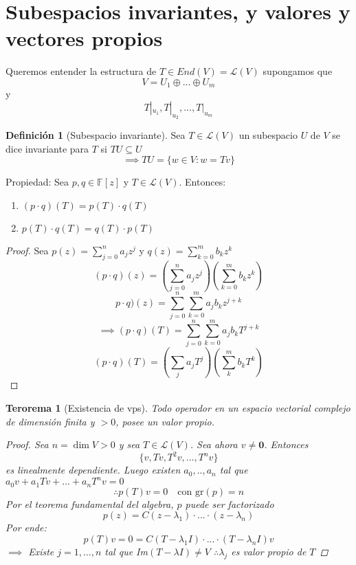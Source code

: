 \documentclass[11pt]{book}
\renewcommand{\vec}[1]{\mathbf{#1}}
\newcommand{\set}[1]{\mathbb{#1}}
\newtheorem{thm}{Terorema}[section]
\theoremstyle{definition}
\newtheorem{defn}{Definición}[section]
\begin{document}
\section{Subespacios invariantes, y valores y vectores propios}
Queremos entender la estructura de $T\in End(V)=\mathcal{L}(V)$ supongamos que
\[V=U_1\oplus...\oplus U_m\]
y
\[T|_{u_1},T|_{u_2},...,T|_{u_m}\]

\begin{defn}[Subespacio invariante]
	Sea $T\in\mathcal{L}(V)$ un subespacio $U$ de $V$ se dice invariante para $T$ si $TU\subseteq U$
	\[\implies TU=\{w\in V:w=Tv\}\]
\end{defn}
Propiedad: Sea $p,q\in\set{F}[z]$ y $T\in\mathcal{L}(V)$. Entonces:
\begin{enumerate}
	\item $(p\cdot q)(T)=p(T)\cdot q(T)$
	
	\item $p(T)\cdot q(T)=q(T)\cdot p(T)$
\end{enumerate}
\begin{proof}
	Sea $p(z)=\sum^n_{j=0}a_jz^j$ y $q(z)=\sum^m_{k=0}b_kz^k$
	\[(p\cdot q)(z)=\left(\sum^n_{j=0}a_jz^j\right)\left(\sum^m_{k=0}b_kz^k\right)\]
	\[p\cdot q)(z)=\sum^n_{j=0}\sum^m_{k=0}a_jb_kz^{j+k}\]
	\[\implies (p\cdot q)(T)=\sum^n_{j=0}\sum^m_{k=0}a_jb_kT^{j+k}\]
	\[(p\cdot q)(T)=(\sum_ja_jT^j)(\sum^m_kb_kT^k)\]
\end{proof}
\begin{thm}[Existencia de vps]
	Todo operador en un espacio vectorial complejo de dimensión finita y $>0$, posee un valor propio.
	\begin{proof}
		Sea $n=\dim V>0$ y sea $T\in\mathcal{L}(V)$. Sea ahora $v\neq\vec{0}$. Entonces
		\[\{v,Tv,T^2v,...,T^nv\}\]
		es linealmente dependiente. Luego existen $a_0,..,a_n$ tal que $a_0v+a_1Tv+...+a_nT^nv=0$
		\[\therefore p(T)v=0\quad\textrm{con gr$(p)=n$}\]
		Por el teorema fundamental del algebra, $p$ puede ser factorizado
		\[p(z)=C(z-\lambda_1)\cdot...\cdot(z-\lambda_n)\]
		Por ende:
		\[p(T)v=0=C(T-\lambda_1 I)\cdot...\cdot(T-\lambda_n I)v\]
		$\implies$ Existe $j=1,...,n$ tal que Im$(T-\lambda I)\neq V$
		$\therefore\lambda_j$ es valor propio de $T$
	\end{proof}
\end{thm}
\end{document}
